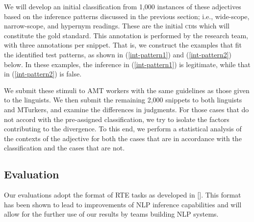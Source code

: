 \documentclass[10pt]{article}
\begin{document}
We will develop an initial classification from 1,000 instances of these adjectives based on the inference patterns discussed in the previous section; i.e., wide-scope, narrow-scope, and hypernym readings. 
These are the initial \textsc{cdi}s  which will constitute the  gold standard. This annotation is performed by the research team, with three annotations per snippet. 
That is, we construct the examples that fit the identified test patterns, as shown in (\ref{int-pattern1}) and (\ref{int-pattern2}) below. In these examples, the inference in (\ref{int-pattern1}) is legitimate, while that in (\ref{int-pattern2}) is false. 

\vspace {-3mm}

\begin{multicols}{2}

\vspace {-6mm}

\end{multicols}
\vspace {-2mm}

 \noindent We submit these stimuli to AMT workers with the same guidelines as those given to the linguists. 
 We then submit the remaining 2,000 snippets to both linguists and MTurkers, and examine the differences in judgments. For those cases that do not accord with the pre-assigned classification, we try to isolate the factors contributing to the divergence. 
 To this end, we perform a statistical analysis of the contexts of the adjective for both the cases that are in accordance with the classification and the cases that are not. 
 

\vspace {-3mm}

\subsection{Evaluation}

\vspace {-3mm}

Our evaluations adopt the format of RTE tasks as developed in [\cite{pascal}]. This format has been shown to lead to improvements of NLP inference capabilities and will allow for the further use of our results by teams building NLP systems. 
\end{document}
